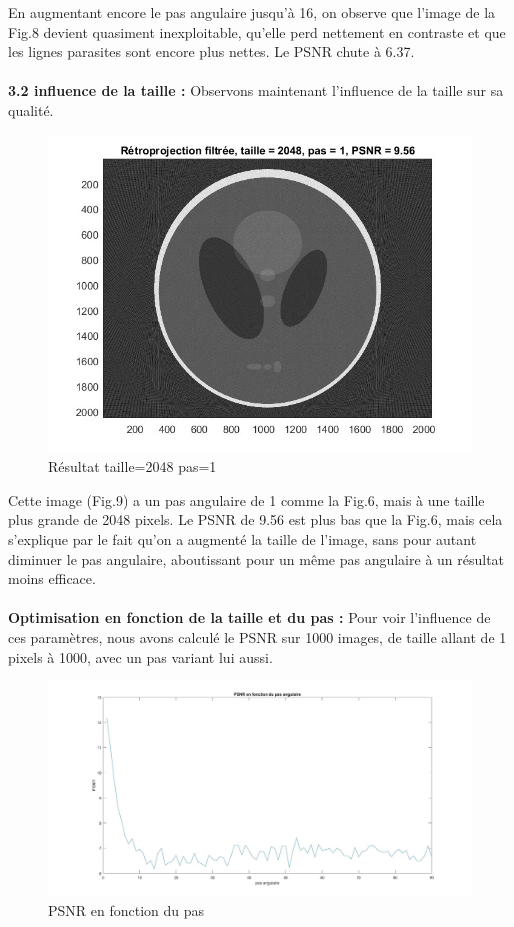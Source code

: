 \documentclass[conference]{IEEEtran}
\begin{document}
En augmentant encore le pas angulaire jusqu'à 16, on observe que l'image de la Fig.8 devient quasiment inexploitable, qu'elle perd nettement en contraste et que les lignes parasites sont encore plus nettes. Le PSNR chute à 6.37.
\\
\\
\textbf{3.2 influence de la taille : }
Observons maintenant l'influence de la taille sur sa qualité.

\begin{figure}[H]
\centering
\includegraphics[scale=0.5]{t2048-p1}
	\caption[Résultat taille=2048 pas=1]{Résultat taille=2048 pas=1}
\label{fig:gallery}
\end{figure}

Cette image (Fig.9) a un pas angulaire de 1 comme la Fig.6, mais à une taille plus grande de 2048 pixels. Le PSNR de 9.56 est plus bas que la Fig.6, mais cela s'explique par le fait qu'on a augmenté la taille de l'image, sans pour autant diminuer le pas angulaire, aboutissant pour un même pas angulaire à un résultat moins efficace.
\\
\\
\textbf{Optimisation en fonction de la taille et du pas : }
Pour voir l'influence de ces paramètres, nous avons calculé le PSNR sur 1000 images, de taille allant de 1 pixels à 1000, avec un pas variant lui aussi.

\begin{figure}[H]
\centering
\includegraphics[scale=0.13]{PSNR2}
	\caption[PSNR en fonction du pas]{PSNR en fonction du pas}
\label{fig:gallery}
\end{figure}
\end{document}
